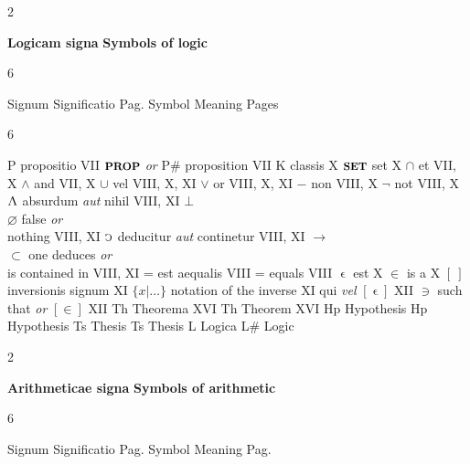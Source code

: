 \documentclass{book}
\newcommand{\s}{\switchcolumn} %
\newcommand{\C}{\mathop{\sbox0{$\displaystyle$$\reflectbox{C}$} %
\raisebox{-\height+\ht0-0.05cm}[\ht0][\dp0]{\scalebox{0.8}[0.8]{\copy0}}}\displaylimits} %
\newcommand{\abs}{\mathop{\rotatebox[origin=c]{180}{V}}}
\newcommand{\such}{\thinspace \rotatebox[origin=c]{180}{$\epsilon$}}
\newcommand{\smallIn}{\ensuremath{\mathrel{\epsilon}}}
\newcommand{\setOfSets}{\mathord{\text{{\footnotesize \textbf{SET}}}}}
\newcommand{\prop}{\mathord{\text{{\footnotesize \textbf{PROP}}}}}
\newenvironment{translateTwoCol}
               { %
                 \columnratio{0.5, 0.5} \begin{paracol}{2}
                 \newcommand{\LAT}{\switchcolumn[0]*}
                 \newcommand{\ENG}{\switchcolumn[1]}
               }
               { %
                 \let\ENG\undefined
                 \let\LAT\undefined
                 \end{paracol}
               }
\newenvironment{translateSixCol}[6]
               { %
                 \setcolumnwidth{#1\fill/1em, #2\fill/1em, #3\fill/\columnsep, #4\fill/1em, #5\fill/1em, #6\fill}
                 \begin{paracol}{6}
               }
               { %
                 \end{paracol}
               }
\begin{document}
\begin{translateTwoCol}
\centering
\textbf{Logicam signa}
\ENG
\textbf{Symbols of logic}
\end{translateTwoCol}

\begin{translateSixCol}{0.05}{0.35}{0.1}{0.05}{0.35}{0.1}
\raggedright
Signum \s Significatio \s Pag.
\s Symbol \s Meaning \s Pages
\end{translateSixCol}

\begin{translateSixCol}{0.06}{0.34}{0.1}{0.06}{0.34}{0.1}
\raggedright
P \s propositio \s VII
\s $\prop$ \emph{or} P\# \s proposition \s VII
\s* $\text{K}$ \s classis \s X
\s $\setOfSets$ \s set \s X
\s* $\cap$ \s et \s VII, X
\s $\wedge$ \s and \s VII, X
\s* $\cup$ \s vel \s VIII, X, XI
\s $\vee$ \s or \s VIII, X, XI
\s* $-$ \s non \s VIII, X
\s $\neg$ \s not \s VIII, X
\s* $\abs$ \s absurdum \emph{aut} nihil \s VIII, XI
\s $\bot$ \\ $\varnothing$ \s false \emph{or} \\ \quad nothing \s VIII, XI
\s* $\C$ \s deducitur \emph{aut} continetur \s VIII, XI
\s $\rightarrow$ \\ $\subset$ \s one deduces \emph{or} \\ \quad is contained in \s VIII, XI
\s* = \s est aequalis \s VIII
\s = \s equals \s VIII
\s* $\smallIn$ \s est \s X
\s $\in$ \s is a \s X   %
\s* $[ \ ]$ \s inversionis signum \s XI
\s $\{ x | \ldots \}$ \s notation of the inverse \s XI  %
\s* \such \s qui \emph{vel} $[ \smallIn ]$ \s XII
\s $\ni$ \s such that \emph{or} $[ \in ]$ \s XII
\s* Th \s Theorema \s XVI
\s  Th \s Theorem \s XVI
\s* Hp \s Hypothesis \s
\s  Hp \s Hypothesis \s
\s* Ts \s Thesis \s
\s  Ts \s Thesis \s
\s* L \s Logica \s
\s  L\# \s Logic \s
\end{translateSixCol}

\vspace{1em}
\begin{translateTwoCol}
\centering
\textbf{Arithmeticae signa}
\ENG
\textbf{Symbols of arithmetic}
\end{translateTwoCol}

\begin{translateSixCol}{0.05}{0.35}{0.1}{0.05}{0.35}{0.1}
\raggedright
Signum \s Significatio \s Pag.
\s Symbol \s Meaning \s Pag.
\end{translateSixCol}
\end{document}
